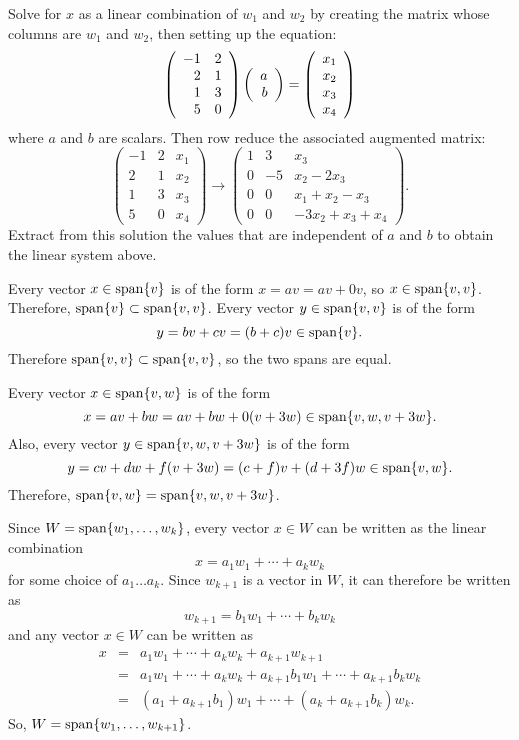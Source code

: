 \soln Solve for $x$ as a linear combination of $w_1$ and $w_2$
by creating the matrix whose columns are $w_1$ and $w_2$,
then setting up the equation:
\[ 
\left(\begin{array}{rr} -1 & 2 \\ 2 & 1 \\ 1 & 3 \\ 5 & 0 
\end{array}\right) \left(\begin{array}{r} a \\ b\end{array}\right) = \left(\begin{array}{r} x_1 \\
x_2 \\ x_3 \\ x_4 \end{array}\right) 
\]
where $a$ and $b$ are scalars.  Then row reduce the associated
augmented matrix:
\[ 
\left(\begin{array}{rr|r} -1 & 2 & x_1 \\ 2 & 1 & x_2 \\ 1 & 3
& x_3 \\ 5 & 0 & x_4 \end{array}\right) \longrightarrow
\left(\begin{array}{rr|l} 1 & 3 & x_3 \\ 0 & -5 & x_2 - 2x_3 \\
0 & 0 & x_1 + x_2 - x_3 \\ 0 & 0 & -3x_2 + x_3 + x_4
\end{array}\right). 
\]
Extract from this solution the values that are independent of $a$
and $b$ to obtain the linear system above.


Every vector $x \in {\rm span}\{v\}$ is of the form $x = av
= av + 0v$, so $x \in {\rm span}\{v,v\}$.  Therefore, ${\rm span}\{v\}
\subset {\rm span}\{v,v\}$.  Every vector $y \in {\rm span}\{v,v\}$ is of the
form 
\[
y = bv + cv = (b + c)v \in {\rm span}\{v\}.
\]
Therefore ${\rm span}\{v,v\} \subset {\rm span}\{v,v\}$, so the two spans are equal.

 Every vector $x \in {\rm span}\{v,w\}$ is of the form 
\[
x = av + bw = av + bw + 0(v + 3w) \in {\rm span}\{v,w,v+3w\}.
\]
  Also, every vector $y \in {\rm span}\{v,w,v+3w\}$ is of the form
\[
y = cv + dw + f(v + 3w) = (c + f)v + (d + 3f)w \in {\rm span}\{v,w\}.
\]
Therefore, ${\rm span}\{v,w\} = {\rm span}\{v,w,v+3w\}$.

Since $W = {\rm span}\{w_1,\dots ,w_k\}$, every vector $x \in W$ can be
written as the linear combination
\[ x = a_1w_1 + \cdots + a_kw_k \]
for some choice of $a_1 \dots a_k$.  Since $w_{k + 1}$ is a vector in
$W$, it can therefore be written as
\[ w_{k + 1} = b_1w_1 + \cdots + b_kw_k \]
and any vector $x \in W$ can be written as
\[ \begin{array}{rcl}
x & = &
a_1w_1 + \cdots + a_kw_k + a_{k+1}w_{k+1} \\
& = & a_1w_1 + \cdots + a_kw_k + a_{k+1}b_1w_1 + \cdots + a_{k+1}b_kw_k
\\ & = & (a_1 + a_{k+1}b_1)w_1 + \cdots + (a_k + a_{k+1}b_k)w_k.
\end{array} \]
So, $W = {\rm span}\{w_1,\dots ,w_{k+1}\}$.

